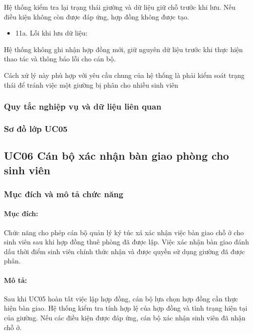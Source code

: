 Hệ thống kiểm tra lại trạng thái giường và dữ liệu giữ chỗ trước khi lưu. Nếu điều kiện không còn được đáp ứng, hợp đồng không được tạo.

\begin{itemize}[leftmargin=1.4em]
\item 11a. Lỗi khi lưu dữ liệu:
\end{itemize}

Hệ thống không ghi nhận hợp đồng mới, giữ nguyên dữ liệu trước khi thực hiện thao tác và thông báo lỗi cho cán bộ.

Cách xử lý này phù hợp với yêu cầu chung của hệ thống là phải kiểm soát trạng thái để tránh việc một giường bị phân cho nhiều sinh viên

\subsubsection{Quy tắc nghiệp vụ và dữ liệu liên quan}


\subsubsection{Sơ đồ lớp UC05}


\subsection{UC06 Cán bộ xác nhận bàn giao phòng cho sinh viên}

\subsubsection{Mục đích và mô tả chức năng}

\paragraph{Mục đích:}

Chức năng cho phép cán bộ quản lý ký túc xá xác nhận việc bàn giao chỗ ở cho sinh viên sau khi hợp đồng thuê phòng đã được lập. Việc xác nhận bàn giao đánh dấu thời điểm sinh viên chính thức nhận và được quyền sử dụng giường đã được phân.

\paragraph{Mô tả:}

Sau khi UC05 hoàn tất việc lập hợp đồng, cán bộ lựa chọn hợp đồng cần thực hiện bàn giao. Hệ thống kiểm tra tính hợp lệ của hợp đồng và tình trạng hiện tại của giường. Nếu các điều kiện được đáp ứng, cán bộ xác nhận sinh viên đã nhận chỗ ở.

